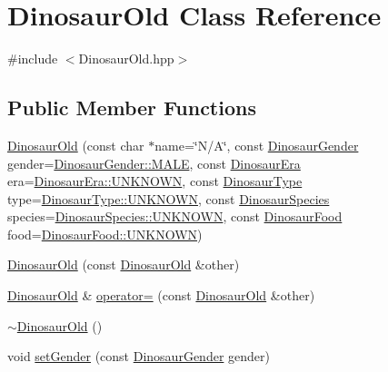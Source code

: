 \hypertarget{classDinosaurOld}{}\section{Dinosaur\+Old Class Reference}
\label{classDinosaurOld}


{\ttfamily \#include $<$Dinosaur\+Old.\+hpp$>$}

\subsection*{Public Member Functions}
\begin{DoxyCompactItemize}
\item 
\hyperlink{classDinosaurOld_a9213152a78d34227e7a8ef2135d2300a}{Dinosaur\+Old} (const char $\ast$name=\char`\"{}N/A\char`\"{}, const \hyperlink{DinosaurOld_8hpp_a98f70ab69c44631b0efc003a2c9b3d30}{Dinosaur\+Gender} gender=\hyperlink{DinosaurOld_8hpp_a98f70ab69c44631b0efc003a2c9b3d30a797e877326f44c5763d1458d7f56d87a}{Dinosaur\+Gender\+::\+M\+A\+LE}, const \hyperlink{DinosaurOld_8hpp_aa47f0b0878c65fb93dcaf8fde26dfaa5}{Dinosaur\+Era} era=\hyperlink{DinosaurOld_8hpp_aa47f0b0878c65fb93dcaf8fde26dfaa5a696b031073e74bf2cb98e5ef201d4aa3}{Dinosaur\+Era\+::\+U\+N\+K\+N\+O\+WN}, const \hyperlink{DinosaurOld_8hpp_a9f8d7b1c3f7b7d03f4101875fa35e8ea}{Dinosaur\+Type} type=\hyperlink{DinosaurOld_8hpp_a9f8d7b1c3f7b7d03f4101875fa35e8eaa696b031073e74bf2cb98e5ef201d4aa3}{Dinosaur\+Type\+::\+U\+N\+K\+N\+O\+WN}, const \hyperlink{DinosaurOld_8hpp_aef2140b5b57464fa283af86adcd6c5c1}{Dinosaur\+Species} species=\hyperlink{DinosaurOld_8hpp_aef2140b5b57464fa283af86adcd6c5c1a696b031073e74bf2cb98e5ef201d4aa3}{Dinosaur\+Species\+::\+U\+N\+K\+N\+O\+WN}, const \hyperlink{DinosaurOld_8hpp_aeeb0837497c35a4ebbceb4e9386909f8}{Dinosaur\+Food} food=\hyperlink{DinosaurOld_8hpp_aeeb0837497c35a4ebbceb4e9386909f8a696b031073e74bf2cb98e5ef201d4aa3}{Dinosaur\+Food\+::\+U\+N\+K\+N\+O\+WN})
\item 
\hyperlink{classDinosaurOld_a2e685c70322e89771d6127985293bdf4}{Dinosaur\+Old} (const \hyperlink{classDinosaurOld}{Dinosaur\+Old} \&other)
\item 
\hyperlink{classDinosaurOld}{Dinosaur\+Old} \& \hyperlink{classDinosaurOld_a37145f147c7b14211f27f73ffcf1613a}{operator=} (const \hyperlink{classDinosaurOld}{Dinosaur\+Old} \&other)
\item 
\hyperlink{classDinosaurOld_a56ecd77ce7904b40c29a9f795084bc6a}{$\sim$\+Dinosaur\+Old} ()
\item 
void \hyperlink{classDinosaurOld_aa9c1e394d304b2f778d5764af018e18e}{set\+Gender} (const \hyperlink{DinosaurOld_8hpp_a98f70ab69c44631b0efc003a2c9b3d30}{Dinosaur\+Gender} gender)

\end{DoxyCompactItemize}
